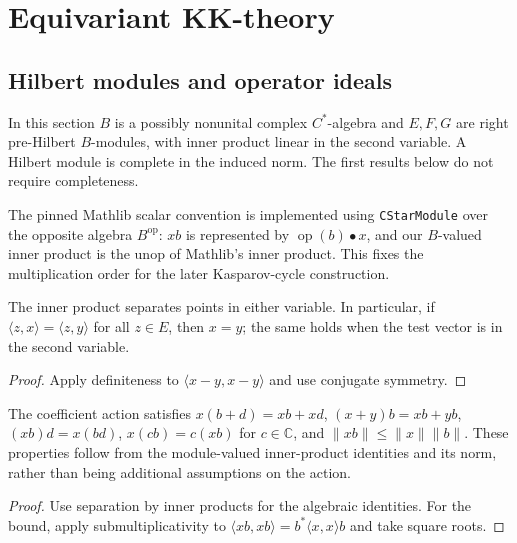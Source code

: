 \chapter{Equivariant KK-theory}
\label{ch:equivariant-kk}

\section{Hilbert modules and operator ideals}
In this section $B$ is a possibly nonunital complex $C^*$-algebra and
$E,F,G$ are right pre-Hilbert $B$-modules, with inner product linear in the
second variable. A Hilbert module is complete in the induced norm.
The first results below do not require completeness.

The pinned Mathlib scalar convention is implemented using
\texttt{CStarModule} over the opposite algebra $B^{\mathrm{op}}$:
$x b$ is represented by $\operatorname{op}(b)\mathbin{\bullet}x$, and
our $B$-valued inner product is the unop of Mathlib's inner product.
This fixes the multiplication order for the later Kasparov-cycle construction.

\begin{proposition}\label{prop:module-inner-separation}
\leanok
The inner product separates points in either variable. In particular,
if $\langle z,x\rangle=\langle z,y\rangle$ for all $z\in E$, then $x=y$;
the same holds when the test vector is in the second variable.
\end{proposition}
\begin{proof}
\leanok
Apply definiteness to $\langle x-y,x-y\rangle$ and use conjugate symmetry.
\end{proof}

\begin{proposition}\label{prop:module-action-bound}
\leanok
The coefficient action satisfies
$x(b+d)=xb+xd$, $(x+y)b=xb+yb$, $(xb)d=x(bd)$,
$x(cb)=c(xb)$ for $c\in\mathbb C$, and
$\|xb\|\leq\|x\|\|b\|$. These properties follow from
the module-valued inner-product identities and its norm, rather than being
additional assumptions on the action.
\end{proposition}
\begin{proof}
\leanok
Use separation by inner products for the algebraic identities. For the bound,
apply submultiplicativity to
$\langle xb,xb\rangle=b^*\langle x,x\rangle b$ and take square roots.
\end{proof}

